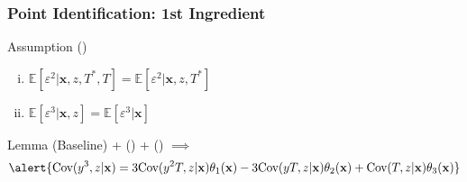 \documentclass{beamer}
\begin{document}
\begin{frame}
  \frametitle{Point Identification: 1st Ingredient}

  \begin{block}{Assumption (\clubsuit)}
    \begin{enumerate}[(i)]
    \item $\mathbb{E}[\varepsilon^2|\mathbf{x},z,T^*,T] = \mathbb{E}[\varepsilon^2|\mathbf{x},z, T^*]$
    \item $\mathbb{E}[\varepsilon^3|\mathbf{x},z] = \mathbb{E}[\varepsilon^3|\mathbf{x}]$
  \end{enumerate}
  \end{block}
 
  \begin{block}{Lemma}
    (Baseline) + (\spadesuit) + (\clubsuit) $\implies$ 
  \small
\[
  \alert{\mbox{Cov}(y^3,z|\mathbf{x}) = 3 \mbox{Cov}(y^2T,z|\mathbf{x}) \theta_1(\mathbf{x}) -3\mbox{Cov}(yT,z|\mathbf{x}) \theta_2(\mathbf{x}) + \mbox{Cov}(T,z|\mathbf{x}) \theta_3(\mathbf{x})}
\]
\end{block}
\end{frame}
\end{document}
